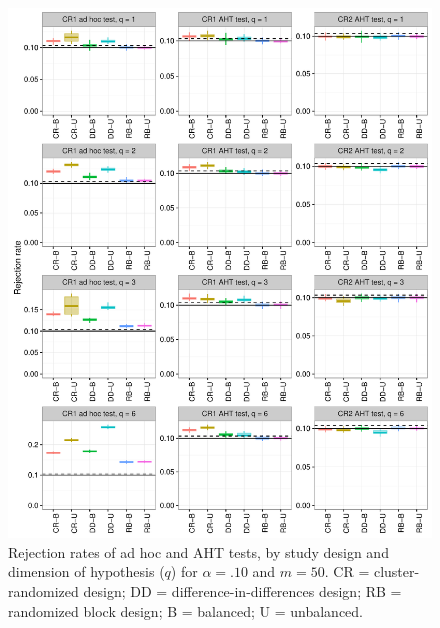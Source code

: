 \documentclass{article}\usepackage[]{graphicx}\usepackage[]{color}
\newenvironment{knitrout}{}{} %
\begin{document}
\begin{knitrout}
\color{fgcolor}\begin{figure}[H]

{\centering \includegraphics[width=\linewidth]{CR_fig/balance_10_50-1} 

}

\caption[Rejection rates of ad hoc and AHT tests, by study design and dimension of hypothesis (]{Rejection rates of ad hoc and AHT tests, by study design and dimension of hypothesis ($q$) for $\alpha = .10$ and $m = 50$. CR = cluster-randomized design; DD = difference-in-differences design; RB = randomized block design; B = balanced; U = unbalanced.}\label{fig:balance_10_50}
\end{figure}


\end{knitrout}
\end{document}
